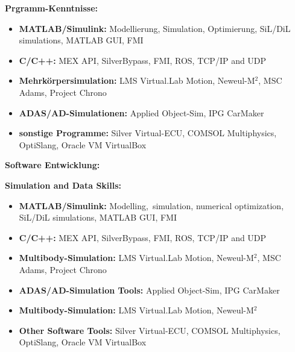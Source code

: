\documentclass{classic}
\begin{document}
\begin{paracol}{2}
    {
        {\bfseries Prgramm-Kenntnisse:}
        \begin{itemize}
            \item {\bfseries MATLAB/Simulink:} Modellierung, Simulation,
                Optimierung, SiL/DiL simulations, MATLAB GUI, FMI
            \item {\bfseries C/C++:} MEX API, SilverBypass, FMI, ROS, TCP/IP and UDP
            \item{\bfseries Mehrk{\"o}rpersimulation:}  LMS Virtual.Lab Motion, Neweul-M$^2$, 
                MSC Adams, Project Chrono
            \item{\bfseries ADAS/AD-Simulationen:} Applied Object-Sim, IPG CarMaker
            \item {\bfseries sonstige Programme:}  Silver Virtual-ECU, COMSOL
                Multiphysics, OptiSlang, Oracle VM VirtualBox
        \end{itemize} \par

        {\bfseries Software Entwicklung:}\par
    }
    {
        {\bfseries Simulation and Data Skills:}
        \begin{itemize}
            \item {\bfseries MATLAB/Simulink:} Modelling, \,simulation,
                numerical optimization, SiL/DiL simulations, MATLAB GUI, FMI
            \item {\bfseries C/C++:} MEX API, SilverBypass, FMI, ROS, TCP/IP and UDP
            \item{\bfseries Multibody-Simulation:}  LMS Virtual.Lab Motion, Neweul-M$^2$, 
                MSC Adams, Project Chrono
            \item{\bfseries ADAS/AD-Simulation Tools:}  Applied Object-Sim, IPG CarMaker
            \item{\bfseries Multibody-Simulation:}  LMS Virtual.Lab Motion, Neweul-M$^2$
            \item {\bfseries Other Software Tools:}  Silver Virtual-ECU, COMSOL
                Multiphysics, OptiSlang, Oracle VM VirtualBox
        \end{itemize} \par

}
\end{paracol}
\end{document}

